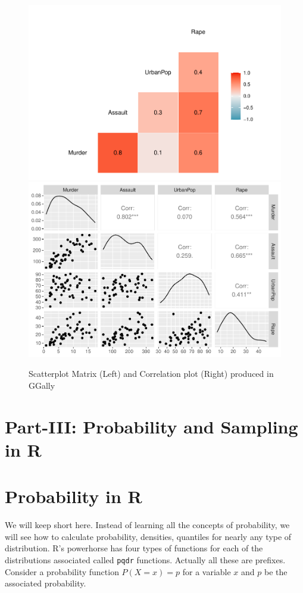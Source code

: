\documentclass[
]{book}
\begin{document}
\begin{figure}

{\centering \includegraphics[width=0.5\linewidth]{DauR_files/figure-latex/two-corr-1} \includegraphics[width=0.5\linewidth]{DauR_files/figure-latex/two-corr-2} 

}

\caption{Scatterplot Matrix (Left) and Correlation plot (Right) produced in GGally}\label{fig:two-corr}
\end{figure}

\hypertarget{part-iii-probability-and-sampling-in-r}{%
\chapter*{Part-III: Probability and Sampling in R}\label{part-iii-probability-and-sampling-in-r}}

\hypertarget{probability-in-r}{%
\chapter{Probability in R}\label{probability-in-r}}

We will keep short here. Instead of learning all the concepts of probability, we will see how to calculate probability, densities, quantiles for nearly any type of distribution. R's powerhorse has four types of functions for each of the distributions associated called \texttt{pqdr} functions. Actually all these are prefixes. Consider a probability function \(P(X=x) = p\) for a variable \(x\) and \(p\) be the associated probability.
\end{document}

